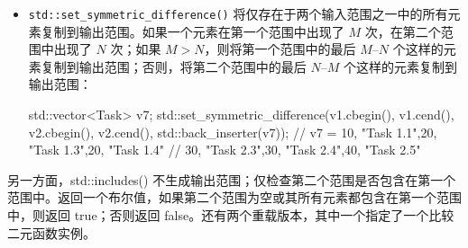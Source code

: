 \begin{itemize}
\item
\verb|std::set_symmetric_difference()| 将仅存在于两个输入范围之一中的所有元素复制到输出范围。如果一个元素在第一个范围中出现了 $M$ 次，在第二个范围中出现了 $N$ 次；如果 $M > N$，则将第一个范围中的最后 $M – N$ 个这样的元素复制到输出范围；否则，将第二个范围中的最后 $N – M$ 个这样的元素复制到输出范围：

\begin{cpp}
std::vector<Task> v7;
std::set_symmetric_difference(v1.cbegin(), v1.cend(),
                              v2.cbegin(), v2.cend(),
                              std::back_inserter(v7));
// v7 = {{10, "Task 1.1"},{20, "Task 1.3"},{20, "Task 1.4"}
//       {30, "Task 2.3"},{30, "Task 2.4"},{40, "Task 2.5"}}
\end{cpp}
\end{itemize}

另一方面，std::includes() 不生成输出范围；仅检查第二个范围是否包含在第一个范围中。返回一个布尔值，如果第二个范围为空或其所有元素都包含在第一个范围中，则返回 true；否则返回 false。还有两个重载版本，其中一个指定了一个比较二元函数实例。

